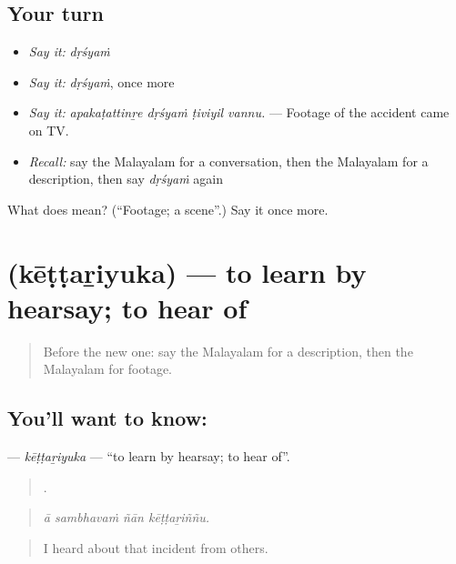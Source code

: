 \subsection*{Your turn}
\begin{itemize}
\raggedright
  \item \emph{Say it:} \emph{dṛśyaṁ}
  \item \emph{Say it:} \emph{dṛśyaṁ}, once more
  \item \emph{Say it:} \emph{apakaṭattinṟe dṛśyaṁ ṭiviyil vannu.} — Footage of the accident came on TV.
  \item \emph{Recall:} say the Malayalam for a conversation, then the Malayalam for a description, then say \emph{dṛśyaṁ} again
\end{itemize}

\begin{tcolorbox}[breakable,colback=teal!4,colframe=teal!35!black,title={Before you move on}]
What does  mean? (\textquotedblleft{}Footage; a scene\textquotedblright{}.) Say it once more.
\end{tcolorbox}
\section[\texorpdfstring{\ml{കേട്ടറിയുക} (kēṭṭaṟiyuka)}{കേട്ടറിയുക (kēṭṭaṟiyuka)}]{ (kēṭṭaṟiyuka) — to learn by hearsay; to hear of}

\label{lesson:ML-C356-kettariyuka}



\begin{quote}
Before the new one: say the Malayalam for a description, then the Malayalam for footage.
\end{quote}

\subsection*{You'll want to know: }
\textbf{} — \emph{kēṭṭaṟiyuka} — \textquotedblleft{}to learn by hearsay; to hear of\textquotedblright{}.

\begin{quote}
   .
\end{quote}

\begin{quote}
\emph{ā sambhavaṁ ñān kēṭṭaṟiññu.}
\end{quote}

\begin{quote}
I heard about that incident from others.
\end{quote}

